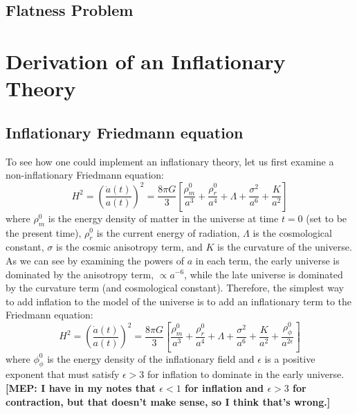 \documentclass[onecolumn,apj]{emulateapj}
\newcommand{\mep}[1]{{\color{applegreen} \textbf{[MEP:  #1]}}}
\begin{document}
\subsection{Flatness Problem}
\label{ssec:Flatness}

\section{Derivation of an Inflationary Theory}
\subsection{Inflationary Friedmann equation}
\label{ssec:InflationaryFriedmann}
To see how one could implement an inflationary theory, let us first examine a non-inflationary Friedmann equation:
\begin{equation}
H^2 = \left ( \frac{\dot a(t)}{a(t)} \right ) ^2 = \frac{8 \pi G}{3} \left [ \frac{\rho^0_m}{a^3} + \frac{\rho^0_r}{a^4} + \Lambda + \frac{\sigma^2}{a^6} + \frac{K}{a^2} \right ]
\end{equation}
where $\rho^0_m$ is the energy density of matter in the universe at time $t=0$ (set to be the present time), $\rho^0_r$ is the current energy of radiation, $\Lambda$ is the cosmological constant, $\sigma$ is the cosmic anisotropy term, and $K$ is the curvature of the universe. As we can see by examining the powers of $a$ in each term, the early universe is dominated by the anisotropy term, $\propto a^{-6}$, while the late universe is dominated by the curvature term (and cosmological constant). Therefore, the simplest way to add inflation to the model of the universe is to add an inflationary term to the Friedmann equation: 
\begin{equation}
H^2 = \left ( \frac{\dot a(t)}{a(t)} \right ) ^2 = \frac{8 \pi G}{3} \left [ \frac{\rho^0_m}{a^3} + \frac{\rho^0_r}{a^4} + \Lambda + \frac{\sigma^2}{a^6} + \frac{K}{a^2} + \frac{\rho^0_\phi}{a^{2\epsilon}} \right ]
\end{equation}
where $\phi^0_\phi$ is the energy density of the inflationary field and $\epsilon$ is a positive exponent that must satisfy $\epsilon>3$ for inflation to dominate in the early universe. \mep{I have in my notes that $\epsilon<1$ for inflation and $\epsilon>3$ for contraction, but that doesn't make sense, so I think that's wrong.} 
\end{document}
